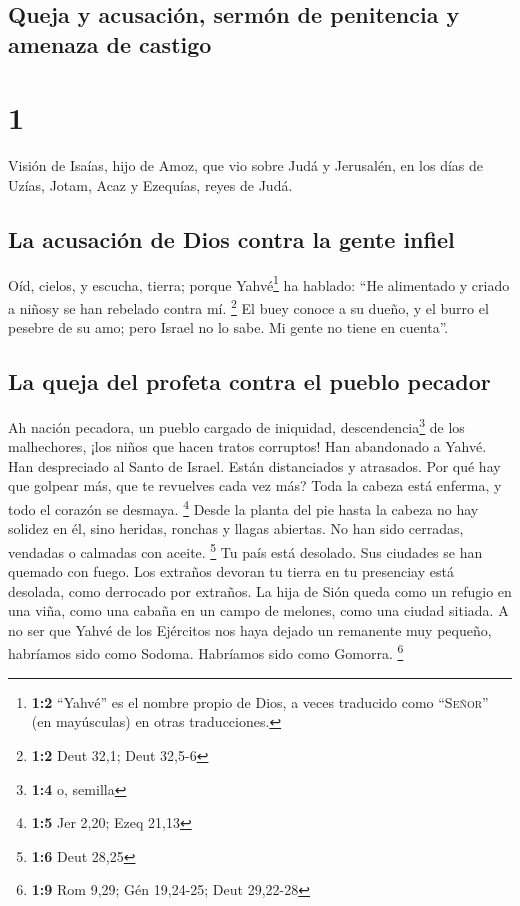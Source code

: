 \hypertarget{queja-y-acusaciuxf3n-sermuxf3n-de-penitencia-y-amenaza-de-castigo}{%
\subsection{Queja y acusación, sermón de penitencia y amenaza de
castigo}\label{queja-y-acusaciuxf3n-sermuxf3n-de-penitencia-y-amenaza-de-castigo}}

\hypertarget{section}{%
\section{1}\label{section}}

 Visión de Isaías, hijo de Amoz, que vio sobre Judá y
Jerusalén, en los días de Uzías, Jotam, Acaz y Ezequías, reyes de Judá.

\hypertarget{la-acusaciuxf3n-de-dios-contra-la-gente-infiel}{%
\subsection{La acusación de Dios contra la gente
infiel}\label{la-acusaciuxf3n-de-dios-contra-la-gente-infiel}}

 Oíd, cielos, y escucha, tierra; porque Yahvé\footnote{\textbf{1:2}
  ``Yahvé'' es el nombre propio de Dios, a veces traducido como
  ``\textsc{Señor}'' (en mayúsculas) en otras traducciones.} ha hablado:
``He alimentado y criado a niñosy se han rebelado contra mí. \footnote{\textbf{1:2}
  Deut 32,1; Deut 32,5-6}  El buey conoce a su dueño, y el
burro el pesebre de su amo; pero Israel no lo sabe. Mi gente no tiene en
cuenta''.

\hypertarget{la-queja-del-profeta-contra-el-pueblo-pecador}{%
\subsection{La queja del profeta contra el pueblo
pecador}\label{la-queja-del-profeta-contra-el-pueblo-pecador}}

 Ah nación pecadora, un pueblo cargado de iniquidad,
descendencia\footnote{\textbf{1:4} o, semilla} de los malhechores, ¡los
niños que hacen tratos corruptos! Han abandonado a Yahvé. Han
despreciado al Santo de Israel. Están distanciados y atrasados.
 Por qué hay que golpear más, que te revuelves cada vez
más? Toda la cabeza está enferma, y todo el corazón se desmaya.
\footnote{\textbf{1:5} Jer 2,20; Ezeq 21,13}  Desde la
planta del pie hasta la cabeza no hay solidez en él, sino heridas,
ronchas y llagas abiertas. No han sido cerradas, vendadas o calmadas con
aceite. \footnote{\textbf{1:6} Deut 28,25}  Tu país está
desolado. Sus ciudades se han quemado con fuego. Los extraños devoran tu
tierra en tu presenciay está desolada, como derrocado por extraños.
 La hija de Sión queda como un refugio en una viña, como
una cabaña en un campo de melones, como una ciudad sitiada.
 A no ser que Yahvé de los Ejércitos nos haya dejado un
remanente muy pequeño, habríamos sido como Sodoma. Habríamos sido como
Gomorra. \footnote{\textbf{1:9} Rom 9,29; Gén 19,24-25; Deut 29,22-28}

